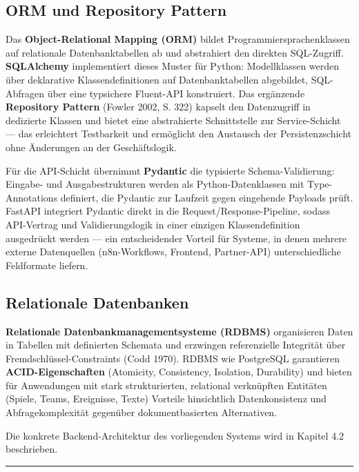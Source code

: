 \subsection{ORM und Repository
Pattern}\label{orm-und-repository-pattern}

Das \textbf{Object-Relational Mapping (ORM)} bildet
Programmiersprachenklassen auf relationale Datenbanktabellen ab und
abstrahiert den direkten SQL-Zugriff. \textbf{SQLAlchemy} implementiert
dieses Muster für Python: Modellklassen werden über deklarative
Klassendefinitionen auf Datenbanktabellen abgebildet, SQL-Abfragen über
eine typsichere Fluent-API konstruiert. Das ergänzende
\textbf{Repository Pattern} (Fowler 2002, S. 322) kapselt den
Datenzugriff in dedizierte Klassen und bietet eine abstrahierte
Schnittstelle zur Service-Schicht --- das erleichtert Testbarkeit und
ermöglicht den Austausch der Persistenzschicht ohne Änderungen an der
Geschäftslogik.

Für die API-Schicht übernimmt \textbf{Pydantic} die typisierte
Schema-Validierung: Eingabe- und Ausgabestrukturen werden als
Python-Datenklassen mit Type-Annotations definiert, die Pydantic zur
Laufzeit gegen eingehende Payloads prüft. FastAPI integriert Pydantic
direkt in die Request/Response-Pipeline, sodass API-Vertrag und
Validierungslogik in einer einzigen Klassendefinition ausgedrückt werden
--- ein entscheidender Vorteil für Systeme, in denen mehrere externe
Datenquellen (n8n-Workflows, Frontend, Partner-API) unterschiedliche
Feldformate liefern.

\subsection{Relationale
Datenbanken}\label{relationale-datenbanken}

\textbf{Relationale Datenbankmanagementsysteme (RDBMS)} organisieren
Daten in Tabellen mit definierten Schemata und erzwingen referenzielle
Integrität über Fremdschlüssel-Constraints (Codd 1970). RDBMS wie
PostgreSQL garantieren \textbf{ACID-Eigenschaften} (Atomicity,
Consistency, Isolation, Durability) und bieten für Anwendungen mit stark
strukturierten, relational verknüpften Entitäten (Spiele, Teams,
Ereignisse, Texte) Vorteile hinsichtlich Datenkonsistenz und
Abfragekomplexität gegenüber dokumentbasierten Alternativen.

Die konkrete Backend-Architektur des vorliegenden Systems wird in
Kapitel 4.2 beschrieben.

\begin{center}\rule{0.5\linewidth}{0.5pt}\end{center}

